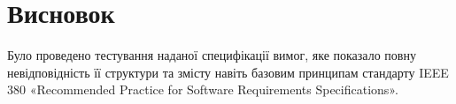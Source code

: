 \documentclass[a4paper,oneside,12pt,DIV=12,titlepage,toc]{scrartcl}
\begin{document}
		\section{Висновок}
			Було проведено тестування наданої специфікації вимог, яке показало повну невідповідність її структури та змісту навіть базовим принципам стандарту IEEE 380 «Recommended Practice for Software Requirements Specifications». 
			
\end{document}
